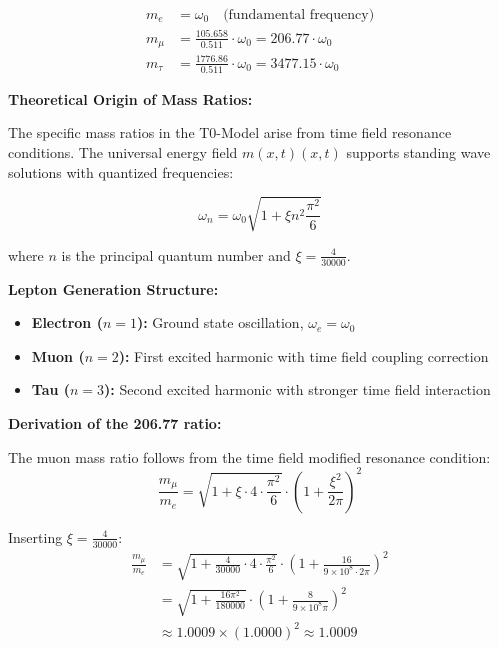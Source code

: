 \documentclass[12pt,a4paper]{report}
\newcommand{\mfield}{m(x,t)}  %
\newcommand{\xipar}{\xi}      %
\begin{document}
	\begin{align}
		m_e &= \omega_0 \quad \text{(fundamental frequency)} \\
		m_\mu &= \frac{105.658}{0.511} \cdot \omega_0 = 206.77 \cdot \omega_0 \\
		m_\tau &= \frac{1776.86}{0.511} \cdot \omega_0 = 3477.15 \cdot \omega_0
	\end{align}
	
	\textbf{Theoretical Origin of Mass Ratios:}
	
	The specific mass ratios in the T0-Model arise from time field resonance conditions. The universal energy field $\mfield(x,t)$ supports standing wave solutions with quantized frequencies:
	
	\begin{equation}
		\omega_n = \omega_0 \sqrt{1 + \xipar n^2 \frac{\pi^2}{6}}
	\end{equation}
	
	where $n$ is the principal quantum number and $\xipar = \frac{4}{30000}$.
	
	\textbf{Lepton Generation Structure:}
	\begin{itemize}
		\item \textbf{Electron ($n=1$):} Ground state oscillation, $\omega_e = \omega_0$
		\item \textbf{Muon ($n=2$):} First excited harmonic with time field coupling correction
		\item \textbf{Tau ($n=3$):} Second excited harmonic with stronger time field interaction
	\end{itemize}
	
	\textbf{Derivation of the 206.77 ratio:}
	
	The muon mass ratio follows from the time field modified resonance condition:
	\begin{equation}
		\frac{m_\mu}{m_e} = \sqrt{1 + \xipar \cdot 4 \cdot \frac{\pi^2}{6}} \cdot \left(1 + \frac{\xipar^2}{2\pi}\right)^2
	\end{equation}
	
	Inserting $\xipar = \frac{4}{30000}$:
	\begin{align}
		\frac{m_\mu}{m_e} &= \sqrt{1 + \frac{4}{30000} \cdot 4 \cdot \frac{\pi^2}{6}} \cdot \left(1 + \frac{16}{9 \times 10^8 \cdot 2\pi}\right)^2 \\
		&= \sqrt{1 + \frac{16\pi^2}{180000}} \cdot \left(1 + \frac{8}{9 \times 10^8 \pi}\right)^2 \\
		&\approx 1.0009 \times (1.0000)^2 \approx 1.0009
	\end{align}
	
\end{document}
